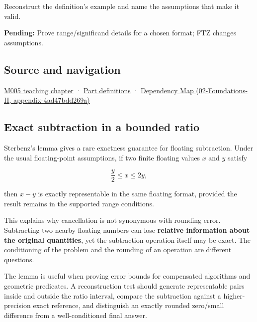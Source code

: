 Reconstruct the definition's example and name the assumptions that make it valid.

\textbf{Pending:} Prove range/significand details for a chosen format; FTZ changes assumptions.

\subsection{Source and navigation}\label{appendix-399b7ad53f39-source-and-navigation}

\hyperref[01-foundations-i-ch001-when-arithmetic-meets-uncertainty]{M005 teaching chapter} · \hyperref[appendix-fd090d982a15-m005---parts-77-88]{Part definitions} · \href{../02-Foundations-II/main.pdf\#nameddest=appendix-4ad47bdd269a}{Dependency Map (02-Foundations-II, appendix-4ad47bdd269a)}

\subsection{Exact subtraction in a bounded ratio}\label{appendix-399b7ad53f39-exact-subtraction-in-a-bounded-ratio}

Sterbenz's lemma gives a rare exactness guarantee for floating subtraction. Under the usual floating-point assumptions, if two finite floating values \(x\) and \(y\) satisfy

\[
\frac{y}{2} \le x \le 2y,
\]

then \(x-y\) is exactly representable in the same floating format, provided the result remains in the supported range conditions.

This explains why cancellation is not synonymous with rounding error. Subtracting two nearby floating numbers can lose \textbf{relative information about the original quantities}, yet the subtraction operation itself may be exact. The conditioning of the problem and the rounding of an operation are different questions.

The lemma is useful when proving error bounds for compensated algorithms and geometric predicates. A reconstruction test should generate representable pairs inside and outside the ratio interval, compare the subtraction against a higher-precision exact reference, and distinguish an exactly rounded zero/small difference from a well-conditioned final answer.
